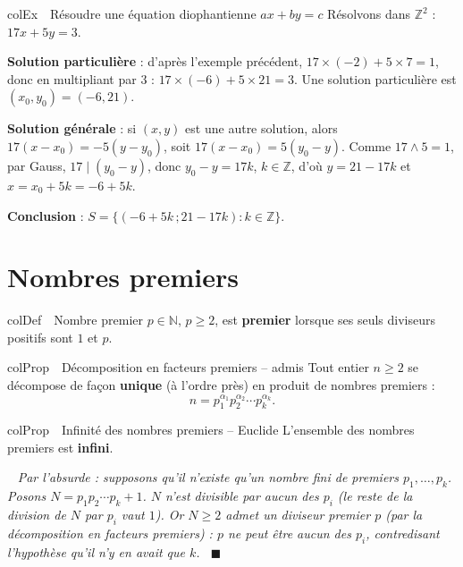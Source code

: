\documentclass[11pt,a4paper]{article}
\newenvironment{definition}[1][Définition]
  {\begin{fiche}{colDef}{\ding{110}~~#1}}{\end{fiche}}
\newenvironment{propriete}[1][Propriété]
  {\begin{fiche}{colProp}{\ding{72}~~#1}}{\end{fiche}}
\newenvironment{exemple}[1][Exemple]
  {\begin{fiche}{colEx}{\ding{217}~~#1}}{\end{fiche}}
\newenvironment{demo}
  {\par\smallskip\noindent{\sffamily\bfseries\color{qtealdark}Démonstration.}\ \itshape}
  {\ \normalfont\hfill$\blacksquare$\par\medskip}
\begin{document}
\begin{exemple}[Résoudre une équation diophantienne $ax+by=c$]
Résolvons dans $\mathbb{Z}^2$ : $17x+5y=3$.

\smallskip
\textbf{Solution particulière} : d'après l'exemple précédent, $17\times(-2)+5\times7=1$, donc en multipliant par $3$ : $17\times(-6)+5\times21=3$. Une solution particulière est $(x_0,y_0)=(-6,21)$.

\smallskip
\textbf{Solution générale} : si $(x,y)$ est une autre solution, alors $17(x-x_0)=-5(y-y_0)$, soit $17(x-x_0)=5(y_0-y)$. Comme $17\wedge5=1$, par Gauss, $17\mid(y_0-y)$, donc $y_0-y=17k$, $k\in\mathbb{Z}$, d'où $y=21-17k$ et $x=x_0+5k=-6+5k$.

\smallskip
\textbf{Conclusion} : $S=\{(-6+5k\,;21-17k) : k\in\mathbb{Z}\}$.
\end{exemple}

\section{Nombres premiers}

\begin{definition}[Nombre premier]
$p\in\mathbb{N}$, $p\geq2$, est \textbf{premier} lorsque ses seuls diviseurs positifs sont $1$ et $p$.
\end{definition}

\begin{propriete}[Décomposition en facteurs premiers -- admis]
Tout entier $n\geq2$ se décompose de façon \textbf{unique} (à l'ordre près) en produit de nombres premiers :
\[
  n = p_1^{\alpha_1}p_2^{\alpha_2}\cdots p_k^{\alpha_k}.
\]
\end{propriete}

\begin{propriete}[Infinité des nombres premiers -- Euclide]
L'ensemble des nombres premiers est \textbf{infini}.
\end{propriete}

\begin{demo}
Par l'absurde : supposons qu'il n'existe qu'un nombre fini de premiers $p_1,\ldots,p_k$. Posons $N=p_1p_2\cdots p_k+1$. $N$ n'est divisible par aucun des $p_i$ (le reste de la division de $N$ par $p_i$ vaut $1$). Or $N\geq2$ admet un diviseur premier $p$ (par la décomposition en facteurs premiers) : $p$ ne peut être aucun des $p_i$, contredisant l'hypothèse qu'il n'y en avait que $k$.
\end{demo}
\end{document}
